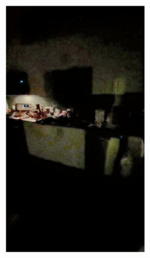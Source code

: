 \documentclass[letterpaper,12pt]{article}
\begin{document}
\begin{figure}[htbp]
\begin{subfigure}{0.128\textwidth}
			\includegraphics[width=\linewidth]{LoLi-Phone-imgT/KinD}
			\captionsetup{font=scriptsize}
			\caption{}
			\label{fig: LoLi-Phone-imgT_f}  
		\end{subfigure}    
		\begin{subfigure}{0.128\textwidth}

\end{subfigure}
\end{figure}
\end{document}
